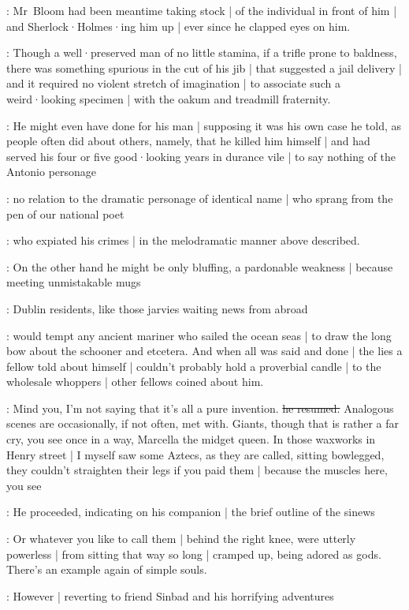 :
Mr~Bloom had been meantime taking stock |
of the individual in front of him |
and Sherlock·Holmes·ing him up |
ever since he clapped eyes on him.

:
Though a well·preserved man of no little stamina,
if a trifle prone to baldness,
there was something spurious in the cut of his jib |
that suggested a jail delivery |
and it required no violent stretch of imagination |
to associate such a weird·looking specimen |
with the oakum and treadmill fraternity.

:
He might even have done for his man |
supposing it was his own case he told,
as people often did about others,
namely,
that he killed him himself |
and had served his four or five good·looking years in durance vile |
to say nothing of the Antonio personage

:
no relation to the dramatic personage of identical name |
who sprang from the pen of our national poet%

:
who expiated his crimes |
in the melodramatic manner above described.

:
On the other hand he might be only bluffing,
a pardonable weakness |
because meeting unmistakable mugs

:
Dublin residents,
like those jarvies waiting news from abroad

:
would tempt any ancient mariner who sailed the ocean seas |
to draw the long bow about the schooner  and etcetera.
And when all was said and done |
the lies a fellow told about himself |
couldn't probably hold a proverbial candle |
to the wholesale whoppers |
other fellows coined about him.

\Bloom:
Mind you,
I'm not saying that it's all a pure invention.
\sout{he resumed.}
Analogous scenes are occasionally,
if not often,
met with.
Giants,
though that is rather a far cry,
you see once in a way,
Marcella the midget queen.
In those waxworks in Henry street |
I myself saw some Aztecs,
as they are called,
sitting bowlegged,
they couldn't straighten their legs if you paid them |
because the muscles here,
you see

:
He proceeded,
indicating on his companion |
the brief outline of the sinews

\Bloom:
Or whatever you like to call them |
behind the right knee,
were utterly powerless |
from sitting that way so long |
cramped up,
being adored as gods.
There's an example again of simple souls.

:
However |
reverting to friend Sinbad and his horrifying adventures

